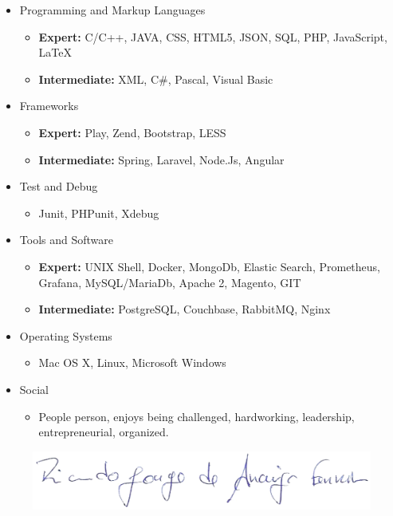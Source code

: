 \documentclass[letterpaper,11pt]{article}
\newcommand{\resitem}[1]{\item #1 \vspace{2pt}}
\begin{document}
\begin{itemize}
\item
	Programming and Markup Languages
	\begin{itemize}
		\resitem{{\bf Expert:} C/C++, JAVA, CSS, HTML5, JSON, SQL, PHP, JavaScript, \LaTeX}
		\resitem{{\bf Intermediate:} XML, C\#, Pascal, Visual Basic}
	\end{itemize}
	
\item
	Frameworks
	\begin{itemize}
		\resitem{{\bf Expert:} Play, Zend, Bootstrap, LESS}
		\resitem{{\bf Intermediate:} Spring, Laravel, Node.Js, Angular}
	\end{itemize}
	
	\item
	Test and Debug
	\begin{itemize}
		\resitem{Junit, PHPunit, Xdebug}
	\end{itemize}

\item
	Tools and Software
	\begin{itemize}
		\resitem{{\bf Expert:} UNIX Shell, Docker, MongoDb, Elastic Search, Prometheus, Grafana, MySQL/MariaDb, Apache 2, Magento, GIT}
		\resitem{{\bf Intermediate:} PostgreSQL, Couchbase, RabbitMQ, Nginx}
	\end{itemize}
	
	\item
	Operating Systems
	\begin{itemize}
		\resitem{Mac OS X, Linux, Microsoft Windows}
	\end{itemize}

	\item
	Social
	\begin{itemize}
		\resitem{People person, enjoys being challenged, hardworking, leadership, entrepreneurial, organized.}
	\end{itemize}
\end{itemize}



\vspace{5mm}

\begin{figure}[h]
\centering
{\includegraphics[scale=0.25]{img/sig.png}}
\end{figure}
\end{document}
